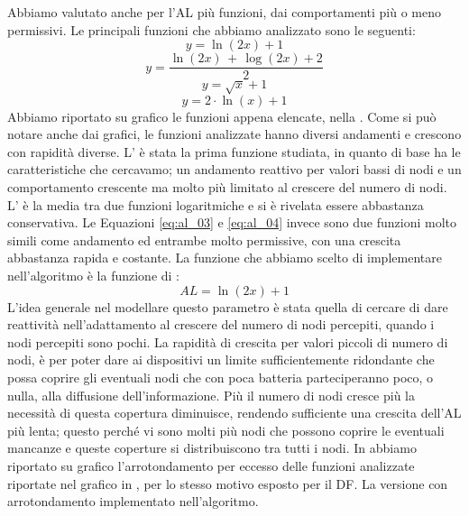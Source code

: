 Abbiamo valutato anche per l'AL più funzioni, dai comportamenti più o meno permissivi. Le principali funzioni che abbiamo analizzato sono le seguenti:
\begin{equation}
	\label{eq:al_01}
	y=\ln \left( 2\textit{x}\right) + 1
\end{equation}
\begin{equation}
	\label{eq:al_02}
	y=\dfrac{\ln \left( 2\textit{x}\right) \, + \, \log\left( 2\textit{x}\right) + 2}{2}
\end{equation}
\begin{equation}
	\label{eq:al_03}
	y=\sqrt{\textit{x}} + 1
\end{equation}
\begin{equation}
	\label{eq:al_04}
	y=2\cdot\ln\left( \textit{x}\right)  + 1
\end{equation}
Abbiamo riportato su grafico le funzioni appena elencate, nella . Come si può notare anche dai grafici, le funzioni analizzate hanno diversi andamenti e crescono con rapidità diverse. L' è stata la prima funzione studiata, in quanto di base ha le caratteristiche che cercavamo; un andamento reattivo per valori bassi di nodi e un comportamento crescente ma molto più limitato al crescere del numero di nodi. L' è la media tra due funzioni logaritmiche e si è rivelata essere abbastanza conservativa. Le Equazioni \eqref{eq:al_03} e \eqref{eq:al_04} invece sono due funzioni molto simili come andamento ed entrambe molto permissive, con una crescita abbastanza rapida e costante. La funzione che abbiamo scelto di implementare nell'algoritmo è la funzione di :
\begin{equation}
	AL=\ln \left( 2\textit{x}\right) + 1 \nonumber
\end{equation}
L'idea generale nel modellare questo parametro è stata quella di cercare di dare reattività nell'adattamento al crescere del numero di nodi percepiti, quando i nodi percepiti sono pochi. La rapidità di crescita per valori piccoli di numero di nodi, è per poter dare ai  dispositivi un limite sufficientemente ridondante che possa coprire gli eventuali nodi che con poca batteria parteciperanno poco, o nulla, alla diffusione dell'informazione. Più il numero di nodi cresce più la necessità di questa copertura diminuisce, rendendo sufficiente una crescita dell'AL più lenta; questo perché vi sono molti più nodi che possono coprire le eventuali mancanze e queste coperture si distribuiscono tra tutti i nodi. In  abbiamo riportato su grafico l'arrotondamento per eccesso delle funzioni analizzate riportate nel grafico in , per lo stesso motivo esposto per il DF. La versione con arrotondamento implementato nell'algoritmo.

